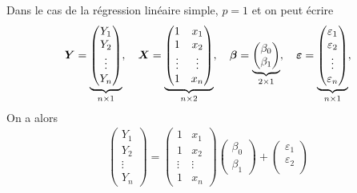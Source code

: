 \begin{exemple}\label{RLSRLM1}
Dans le cas de la régression linéaire simple, $p=1$ et on peut écrire
\begin{align*}
    \bm{Y} = \underbrace{\begin{pmatrix}
        Y_1 \\
        Y_2  \\
        \vdots \\
        Y_n
    \end{pmatrix}}_{n\times 1}, \quad
    \bm{X} =
    \underbrace{\begin{pmatrix}
        1 & x_{1}   \\
        1 & x_{2}  \\
        \vdots & \vdots \\
        1 & x_{n}  
    \end{pmatrix}}_{n \times 2}, \quad
    \bm\beta = \underbrace{\begin{pmatrix}
        \beta_0 \\
        \beta_1 
    \end{pmatrix}}_{2 \times 1}, \quad
    \bm\varepsilon = \underbrace{\begin{pmatrix}
        \varepsilon_1 \\
        \varepsilon_2 \\
        \vdots \\
        \varepsilon_n 
    \end{pmatrix}}_{n \times 1}, 
\end{align*}
On a alors
\begin{align*}
    \begin{pmatrix}
        Y_1 \\
        Y_2  \\
        \vdots \\
        Y_n
    \end{pmatrix}
    =
    \begin{pmatrix}
        1 & x_{1}   \\
        1 & x_{2}  \\
        \vdots & \vdots \\
        1 & x_{n}  
    \end{pmatrix}
    \begin{pmatrix}
        \beta_0 \\
        \beta_1 
    \end{pmatrix}
    +
    \begin{pmatrix}
        \varepsilon_1 \\
        \varepsilon_2 \\

\end{pmatrix}
\end{align*}
\end{exemple}
